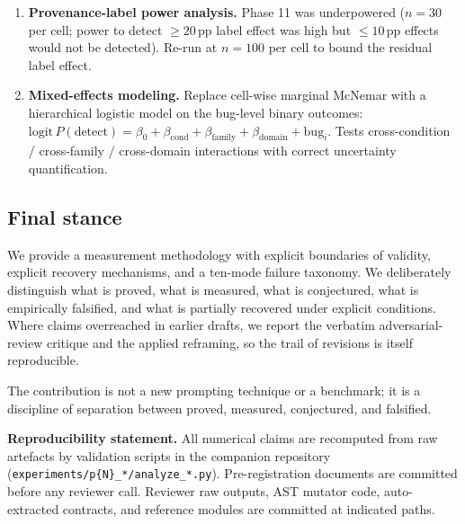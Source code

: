 \begin{enumerate}[leftmargin=2em]
\item \textbf{Provenance-label power analysis.} Phase 11 was underpowered ($n = 30$ per cell; power to detect $\ge 20\,\mathrm{pp}$ label effect was high but $\le 10\,\mathrm{pp}$ effects would not be detected). Re-run at $n = 100$ per cell to bound the residual label effect.

\item \textbf{Mixed-effects modeling.} Replace cell-wise marginal McNemar with a hierarchical logistic model on the bug-level binary outcomes: $\mathrm{logit}\,P(\text{detect}) = \beta_0 + \beta_{\text{cond}} + \beta_{\text{family}} + \beta_{\text{domain}} + \mathrm{bug}_i$. Tests cross-condition / cross-family / cross-domain interactions with correct uncertainty quantification.
\end{enumerate}

\subsection{Final stance}

We provide a measurement methodology with explicit boundaries of validity, explicit recovery mechanisms, and a ten-mode failure taxonomy. We deliberately distinguish what is proved, what is measured, what is conjectured, what is empirically falsified, and what is partially recovered under explicit conditions. Where claims overreached in earlier drafts, we report the verbatim adversarial-review critique and the applied reframing, so the trail of revisions is itself reproducible.

The contribution is not a new prompting technique or a benchmark; it is a discipline of separation between proved, measured, conjectured, and falsified.

\vspace{1em}
\noindent\textbf{Reproducibility statement.} All numerical claims are recomputed from raw artefacts by validation scripts in the companion repository (\texttt{experiments/p\{N\}\_*/analyze\_*.py}). Pre-registration documents are committed before any reviewer call. Reviewer raw outputs, AST mutator code, auto-extracted contracts, and reference modules are committed at indicated paths.
